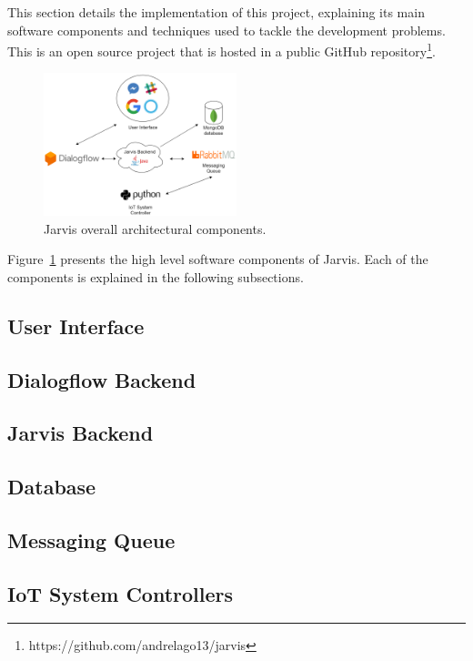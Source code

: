 \documentclass[runningheads]{llncs}
\begin{document}
This section details the implementation of this project, explaining its main software components and techniques used to tackle the development problems. This is an open source project that is hosted in a public GitHub repository\footnote{https://github.com/andrelago13/jarvis}.

\begin{figure}
    \begin{center}
        \includegraphics[width=0.5\textwidth]{figures/architecture.png}
        \caption{Jarvis overall architectural components.} \label{fig:architecture}
    \end{center}
\end{figure}

Figure~\ref{fig:architecture} presents the high level software components of Jarvis. Each of the components is explained in the following subsections.

\subsection{User Interface}
\subsection{Dialogflow Backend}
\subsection{Jarvis Backend}
\subsection{Database}
\subsection{Messaging Queue}
\subsection{IoT System Controllers}
\end{document}
